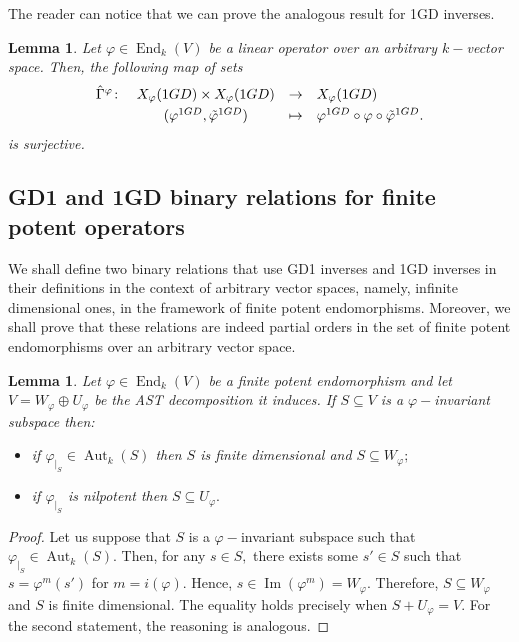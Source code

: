 \documentclass[10pt,a4paper]{amsart}
\newtheorem{lem}[defn]{Lemma}
\theoremstyle{plain}
\theoremstyle{remark}
\numberwithin{equation}{section} \numberwithin{defn}{section}
\newcommand\ed{\operatorname{End}}
\newcommand{\Img}{\operatorname{Im}}
\newcommand\aut{\operatorname{Aut}}
\newcommand{\f}{\varphi}
\begin{document}
The reader can notice that we can prove the analogous result for 1GD inverses.

\begin{lem}\label{L: 1GD1GD en 1GD}
Let $\f \in \ed_k(V)$ be a linear operator over an arbitrary $k-$vector space. Then, the following map of sets  $$\begin{array}{rccl}
\hat{\Gamma}^{\f} \colon & X_{\f}(1GD)\times X_{\f}(1GD)  & \rightarrow & X_{\f}(1GD) \smallskip\\
& (\f^{1GD},\tilde{\f}^{1GD}) & \mapsto & \f^{1GD}\circ \f \circ \tilde{\f}^{1GD}.
\end{array} $$
is surjective.
\end{lem}







\subsection{GD1 and 1GD binary relations for finite potent operators}\label{ss: GD1o y 1GDo}
We shall define two binary relations that use GD1 inverses and 1GD inverses in their definitions in the context of arbitrary vector spaces, namely, infinite dimensional ones, in the framework of finite potent endomorphisms. Moreover, we shall prove that these relations are indeed partial orders in the set of finite potent endomorphisms over an arbitrary vector space.

\begin{lem}\label{L: Maximalidad Sub Inv}
Let $\f\in \ed_k(V)$ be a finite potent endomorphism and let $V=W_{\f}\oplus U_{\f}$ be the AST decomposition it induces. If $S\subseteq V$ is a $\f-$invariant subspace then: \begin{itemize}
\item if $\f_{\vert_{S}}\in \aut_{k}(S)$ then $S$ is finite dimensional and $S\subseteq W_{\f};$
\item if $\f_{\vert_{S}}$ is nilpotent then $S\subseteq U_{\f}.$
\end{itemize}
\end{lem}
\begin{proof}
Let us suppose that $S$ is a $\f-$invariant subspace such that $\f_{\vert_{S}}\in \aut_{k}(S).$ Then, for any $s\in S,$ there exists some $s'\in S$ such that $s=\f^m(s')$ for $m=i(\f).$ Hence, $s\in \Img(\f^m)=W_{\f}.$ Therefore, $S\subseteq W_{\f}$ and $S$ is finite dimensional. The equality holds precisely when $S+U_{\f}=V.$ For the second statement, the reasoning is analogous.
\end{proof}
\end{document}
